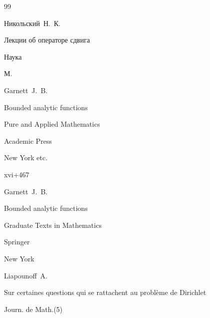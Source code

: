 \begin{thebibliography}{99}





\by Никольский~Н.~К.

\book Лекции об операторе сдвига


\publ Наука

\publaddr М.





\by Garnett~J.~B.

\book Bounded analytic functions

\serial Pure and Applied Mathematics



\publ Academic Press

\publaddr New York etc.

\totalpages xvi+467




\moreref

\by Garnett~J.~B.

\book Bounded analytic functions

\serial Graduate Texts in Mathematics



\publ Springer

\publaddr New York







\by Liapounoff~A.

\paper Sur certaines questions qui se rattachent au probl\`eme de Dirichlet

\jour Journ. de Math.\rm (5)


\end{thebibliography}
